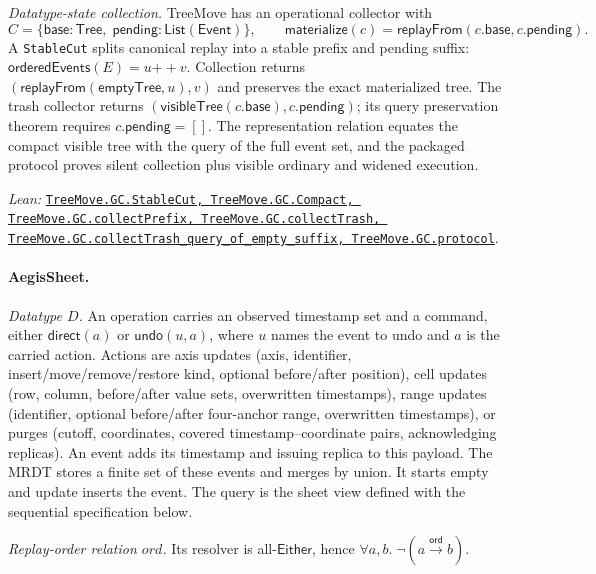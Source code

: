 \documentclass[11pt]{article}
\theoremstyle{definition}
\newcommand{\ord}{\mathrel{\xrightarrow{\mathsf{ord}}}}
\newcommand{\lean}[1]{\texttt{#1}}
\newcommand{\src}[2]{\href{../../#1}{\texttt{#2}}}
\newcommand{\anchor}[2]{\par\smallskip\noindent\emph{Lean: }\src{#1}{#2}.}
\begin{document}
\emph{Datatype-state collection.} TreeMove has an operational collector with
\[
 C=\{\mathsf{base}:\mathsf{Tree},\;
      \mathsf{pending}:\mathsf{List}(\mathsf{Event})\},\qquad
 \mathsf{materialize}(c)=
   \mathsf{replayFrom}(c.\mathsf{base},c.\mathsf{pending}).
\]
A \lean{StableCut} splits canonical replay into a stable prefix and pending
suffix: $\mathsf{orderedEvents}(E)=u{+\!+}v$. Collection returns
$(\mathsf{replayFrom}(\mathsf{emptyTree},u),v)$ and preserves the exact
materialized tree. The trash collector returns
$(\mathsf{visibleTree}(c.\mathsf{base}),c.\mathsf{pending})$; its query
preservation theorem requires $c.\mathsf{pending}=[]$. The
representation relation equates the compact visible tree with the query of
the full event set, and the packaged protocol proves silent collection plus
visible ordinary and widened execution.
\anchor{Sal/MRDTs/Instances/TreeMoveGC.lean}
  {TreeMove.GC.StableCut, TreeMove.GC.Compact,
   TreeMove.GC.collectPrefix, TreeMove.GC.collectTrash,
   TreeMove.GC.collectTrash\_query\_of\_empty\_suffix,
   TreeMove.GC.protocol}

\paragraph{AegisSheet.}

\emph{Datatype $D$.} An operation carries an observed timestamp set and a command, either
$\mathsf{direct}(a)$ or $\mathsf{undo}(u,a)$, where $u$ names the event to undo
and $a$ is the carried action. Actions are axis updates (axis, identifier,
insert/move/remove/restore kind, optional before/after position), cell updates
(row, column, before/after value sets, overwritten timestamps), range updates
(identifier, optional before/after four-anchor range, overwritten timestamps),
or purges (cutoff, coordinates, covered timestamp--coordinate pairs,
acknowledging replicas).
An event adds its timestamp and issuing replica to this payload.
The MRDT stores a finite set of these events and merges by union.
It starts empty and update inserts the event.
The query is the sheet view defined with the sequential specification below.

\emph{Replay-order relation $ord$.} Its resolver is all-$\mathsf{Either}$, hence
$\forall a,b.\;\neg(a\ord b)$.
\end{document}
